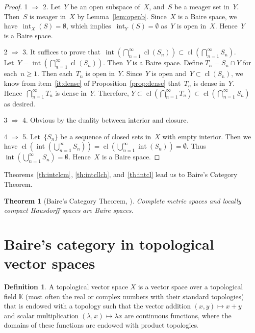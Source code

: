 \documentclass[11pt,a4paper]{article}
\newtheorem{theorem}{Theorem}[section]
\theoremstyle{definition}
\newtheorem{definition}{Definition}[section]
\def\KK{\mathbb{K}}
\DeclareMathOperator{\inter}{int}
\DeclareMathOperator{\cl}{cl}
\numberwithin{equation}{section}
\begin{document}
\begin{proof}
  1 $\Rightarrow$ 2. Let~$Y$ be an open subspace of~$X$, and~$S$ be a meager set in~$Y$.
  Then~$S$ is meager in~$X$ by Lemma~\ref{lem:openb}. Since~$X$ is a Baire space, we
  have~$\inter_X(S)=\emptyset$, which implies~$\inter_Y(S)=\emptyset$ as~$Y$ is open in~$X$.
  Hence~$Y$ is a Baire space. 

  2 $\Rightarrow$ 3. It suffices to prove that~$\inter(\bigcap_{n=1}^\infty \cl(S_n))\subset\cl(\bigcap_{n=1}^\infty S_n)$. 
  Let~$Y=\inter(\bigcap_{n=1}^\infty \cl(S_n))$. Then~$Y$ is a Baire space. 
  Define $T_n = S_n\cap Y$ for each~$n\ge 1$. Then each~$T_n$ is open in~$Y$. Since~$Y$ is open
  and~$Y\subset \cl(S_n)$, we know from item~\ref{it:dense} of Proposition~\ref{prop:dense}
  that~$T_n$ is dense in~$Y$. Hence~$\bigcap_{n=1}^\infty T_n$
  is dense in~$Y$. Therefore, $Y \subset \cl(\bigcap_{n=1}^\infty T_n) \subset
  \cl(\bigcap_{n=1}^\infty S_n)$ as desired. 

  3 $\Rightarrow$ 4. Obvious by the duality between interior and closure. 

  4 $\Rightarrow$ 5. Let~$\{S_n\}$ be a sequence of closed sets in~$X$ with empty interior. Then we
    have
  $\cl(\inter(\bigcup_{n=1}^\infty S_n)) = \cl(\bigcup_{n=1}^\infty \inter(S_n)) = \emptyset$.
  Thus~$\inter(\bigcup_{n=1}^\infty S_n) = \emptyset$. Hence~$X$ is a Baire space. 
\end{proof}

Theorems~\ref{th:intclcm}, \ref{th:intcllch}, and~\ref{th:intcl} lead us to Baire's Category
Theorem.

\begin{theorem}[Baire's Category Theorem, {\cite[Theorem~48.2]{Munkres_2000}}]
  \label{th:Baire}
  Complete metric spaces and locally compact Hausdorff spaces are Baire spaces.
\end{theorem}


\section{Baire's category in topological vector spaces}

\begin{definition}
 A topological vector space $X$ is a vector space over a topological field $\KK$ (most often the
 real or complex numbers with their standard topologies) that is endowed with a topology such that
 the vector addition $(x,y)\mapsto x+y$ and scalar multiplication $(\lambda, x) \mapsto \lambda x$ are continuous functions, where the domains of these
 functions are endowed with product topologies.
\end{definition}
\end{document}
